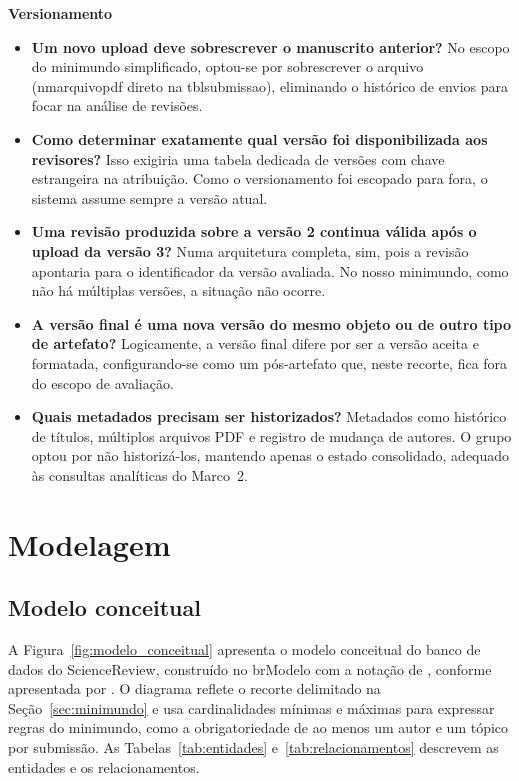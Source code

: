 \documentclass[12pt,a4paper]{article}
\newcommand{\tbus}{\textunderscore\allowbreak}
\newcommand{\tb}[1]{{\ttfamily\let\_\tbus #1}}
\begin{document}
\vspace{6pt}
\noindent\textbf{Versionamento}
\begin{itemize}
    \item \textbf{Um novo upload deve sobrescrever o manuscrito anterior?} No escopo do minimundo simplificado, optou-se por sobrescrever o arquivo (\tb{nm\_arquivo\_pdf} direto na \tb{tbl\_submissao}), eliminando o histórico de envios para focar na análise de revisões.
    \item \textbf{Como determinar exatamente qual versão foi disponibilizada aos revisores?} Isso exigiria uma tabela dedicada de versões com chave estrangeira na atribuição. Como o versionamento foi escopado para fora, o sistema assume sempre a versão atual.
    \item \textbf{Uma revisão produzida sobre a versão 2 continua válida após o upload da versão 3?} Numa arquitetura completa, sim, pois a revisão apontaria para o identificador da versão avaliada. No nosso minimundo, como não há múltiplas versões, a situação não ocorre.
    \item \textbf{A versão final é uma nova versão do mesmo objeto ou de outro tipo de artefato?} Logicamente, a versão final difere por ser a versão aceita e formatada, configurando-se como um pós-artefato que, neste recorte, fica fora do escopo de avaliação.
    \item \textbf{Quais metadados precisam ser historizados?} Metadados como histórico de títulos, múltiplos arquivos PDF e registro de mudança de autores. O grupo optou por não historizá-los, mantendo apenas o estado consolidado, adequado às consultas analíticas do Marco~2.
\end{itemize}

\section{Modelagem}\label{sec:modelagem}

\subsection{Modelo conceitual}
A Figura~\ref{fig:modelo_conceitual} apresenta o modelo conceitual do banco de dados do
ScienceReview, construído no brModelo \citep{brmodelo} com a notação de
\citet{chen1976}, conforme apresentada por \citet{heuser2009}. O diagrama reflete o
recorte delimitado na Seção~\ref{sec:minimundo} e usa cardinalidades mínimas e máximas
para expressar regras do minimundo, como a obrigatoriedade de ao menos um autor e um
tópico por submissão. As Tabelas~\ref{tab:entidades} e~\ref{tab:relacionamentos}
descrevem as entidades e os relacionamentos.
\end{document}
